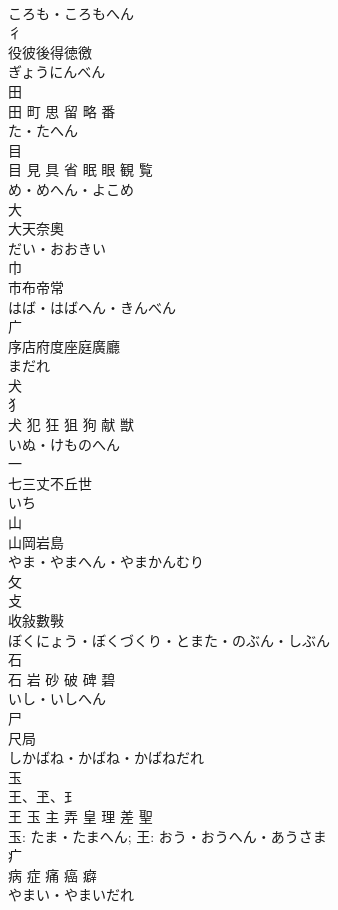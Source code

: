 \documentclass[8pt]{extreport}
\begin{document}
\begin{CJK}{UTF8}{min}
\\	ころも・ころもへん	
\\	彳	
\\	役彼後得徳徼	
\\	ぎょうにんべん	
\\	田	
\\	田 町 思 留 略 番	
\\	た・たへん	
\\	目	
\\	目 見 具 省 眠 眼 観 覧	
\\	め・めへん・よこめ	
\\	大	
\\	大天奈奧	
\\	だい・おおきい	
\\	巾	
\\	市布帝常	
\\	はば・はばへん・きんべん	
\\	广	
\\	序店府度座庭廣廳	
\\	まだれ	
\\	犬	
\\	犭 
\\	犬 犯 狂 狙 狗 献 獣	
\\	いぬ・けものへん	
\\	一	
\\	七三丈不丘世	
\\	いち	
\\	山	
\\	山岡岩島	
\\	やま・やまへん・やまかんむり	
\\	攵	
\\	攴 
\\	收敍數斅	
\\	ぼくにょう・ぼくづくり・とまた・のぶん・しぶん	
\\	石	
\\	石 岩 砂 破 碑 碧	
\\	いし・いしへん	
\\	尸	
\\	尺局	
\\	しかばね・かばね・かばねだれ	
\\	玉	
\\	王、玊、⺩ 
\\	王 玉 主 弄 皇 理 差 聖	
\\	玉: たま・たまへん; 王: おう・おうへん・あうさま	
\\	疒	
\\	病 症 痛 癌 癖	
\\	やまい・やまいだれ	

\end{CJK}
\end{document}

